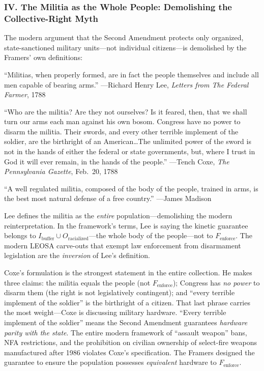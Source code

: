 \subsubsection*{IV. The Militia as the Whole People: Demolishing the Collective-Right Myth}

The modern argument that the Second Amendment protects only organized, state-sanctioned military units---not individual citizens---is demolished by the Framers' own definitions:

\begin{historicalsource}
``Militias, when properly formed, are in fact the people themselves and include all men capable of bearing arms.'' \hfill ---Richard Henry Lee, \textit{Letters from The Federal Farmer}, 1788

\medskip
``Who are the militia? Are they not ourselves? Is it feared, then, that we shall turn our arms each man against his own bosom. Congress have no power to disarm the militia. Their swords, and every other terrible implement of the soldier, are the birthright of an American\ldots The unlimited power of the sword is not in the hands of either the federal or state governments, but, where I trust in God it will ever remain, in the hands of the people.'' \hfill ---Tench Coxe, \textit{The Pennsylvania Gazette}, Feb.\ 20, 1788

\medskip
``A well regulated militia, composed of the body of the people, trained in arms, is the best most natural defense of a free country.'' \hfill ---James Madison
\end{historicalsource}

Lee defines the militia as the \textit{entire} population---demolishing the modern reinterpretation. In the framework's terms, Lee is saying the kinetic guarantee belongs to $I_{\text{buffer}} \cup O_{\text{racialized}}$---the whole body of the people---not to $F_{\text{enforce}}$. The modern LEOSA carve-outs that exempt law enforcement from disarmament legislation are the \textit{inversion} of Lee's definition.

Coxe's formulation is the strongest statement in the entire collection. He makes three claims: the militia equals the people (not $F_{\text{enforce}}$); Congress has \textit{no power} to disarm them (the right is not legislatively contingent); and ``every terrible implement of the soldier'' is the birthright of a citizen. That last phrase carries the most weight---Coxe is discussing military hardware. ``Every terrible implement of the soldier'' means the Second Amendment guarantees \textit{hardware parity with the state}. The entire modern framework of ``assault weapon'' bans, NFA restrictions, and the prohibition on civilian ownership of select-fire weapons manufactured after 1986 violates Coxe's specification. The Framers designed the guarantee to ensure the population possesses \textit{equivalent} hardware to $F_{\text{enforce}}$.

